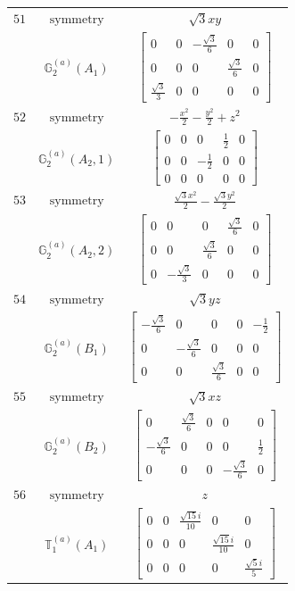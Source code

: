 \documentclass[fleqn,8pt,landscape]{jsarticle}
\begin{document}
\begin{longtable}{ccc}
$ 51 $ & $ \text{symmetry} $ & $ \sqrt{3} x y $ \\
$  $ & $ \mathbb{G}_{2}^{(a)}(A_{1}) $ & $ \begin{bmatrix} 0 & 0 & - \frac{\sqrt{3}}{6} & 0 & 0 \\ 0 & 0 & 0 & \frac{\sqrt{3}}{6} & 0 \\ \frac{\sqrt{3}}{3} & 0 & 0 & 0 & 0 \end{bmatrix} $ \\ \hline
$ 52 $ & $ \text{symmetry} $ & $ - \frac{x^{2}}{2} - \frac{y^{2}}{2} + z^{2} $ \\
$  $ & $ \mathbb{G}_{2}^{(a)}(A_{2},1) $ & $ \begin{bmatrix} 0 & 0 & 0 & \frac{1}{2} & 0 \\ 0 & 0 & - \frac{1}{2} & 0 & 0 \\ 0 & 0 & 0 & 0 & 0 \end{bmatrix} $ \\ \hline
$ 53 $ & $ \text{symmetry} $ & $ \frac{\sqrt{3} x^{2}}{2} - \frac{\sqrt{3} y^{2}}{2} $ \\
$  $ & $ \mathbb{G}_{2}^{(a)}(A_{2},2) $ & $ \begin{bmatrix} 0 & 0 & 0 & \frac{\sqrt{3}}{6} & 0 \\ 0 & 0 & \frac{\sqrt{3}}{6} & 0 & 0 \\ 0 & - \frac{\sqrt{3}}{3} & 0 & 0 & 0 \end{bmatrix} $ \\ \hline
$ 54 $ & $ \text{symmetry} $ & $ \sqrt{3} y z $ \\
$  $ & $ \mathbb{G}_{2}^{(a)}(B_{1}) $ & $ \begin{bmatrix} - \frac{\sqrt{3}}{6} & 0 & 0 & 0 & - \frac{1}{2} \\ 0 & - \frac{\sqrt{3}}{6} & 0 & 0 & 0 \\ 0 & 0 & \frac{\sqrt{3}}{6} & 0 & 0 \end{bmatrix} $ \\ \hline
$ 55 $ & $ \text{symmetry} $ & $ \sqrt{3} x z $ \\
$  $ & $ \mathbb{G}_{2}^{(a)}(B_{2}) $ & $ \begin{bmatrix} 0 & \frac{\sqrt{3}}{6} & 0 & 0 & 0 \\ - \frac{\sqrt{3}}{6} & 0 & 0 & 0 & \frac{1}{2} \\ 0 & 0 & 0 & - \frac{\sqrt{3}}{6} & 0 \end{bmatrix} $ \\ \hline
$ 56 $ & $ \text{symmetry} $ & $ z $ \\
$  $ & $ \mathbb{T}_{1}^{(a)}(A_{1}) $ & $ \begin{bmatrix} 0 & 0 & \frac{\sqrt{15} i}{10} & 0 & 0 \\ 0 & 0 & 0 & \frac{\sqrt{15} i}{10} & 0 \\ 0 & 0 & 0 & 0 & \frac{\sqrt{5} i}{5} \end{bmatrix} $ \\ \hline

\end{longtable}
\end{document}
